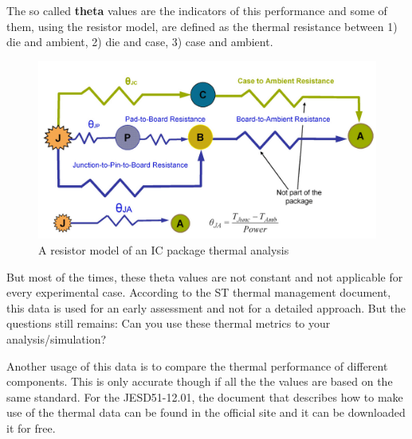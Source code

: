 \documentclass[final]{cubedoc}
\begin{document}
The so called \textbf{theta} values are the indicators of this performance and some of them, using the resistor model, are defined as the thermal resistance between 1) die and ambient, 2) die and case, 3) case and ambient.

\begin{figure}[h!]
    \centering
    \includegraphics[width=\textwidth]{docs/resistor_model.png}
    \caption{A resistor model of an IC package thermal analysis} 
    \label{fig:my_label}
\end{figure}

But most of the times, these theta values are not constant and not applicable for every experimental case. According to the ST thermal management document, this data is used for an early assessment and not for a detailed approach. But the questions still remains: Can you use these thermal metrics to your analysis/simulation?

Another usage of this data is to compare the thermal performance of different components. This is only accurate though if all the the values are based on the same standard. For the JESD51-12.01, the document that describes how to make use of the thermal data can be found in the official site and it can be downloaded it for free.

\end{document}
